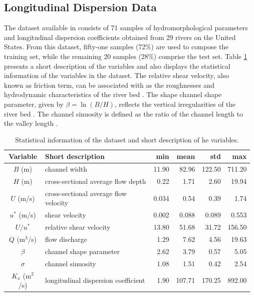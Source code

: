 \documentclass[a4paper,12pt, english]{article}
\begin{document}
\subsection{\label{sec:methods:dataset} Longitudinal Dispersion Data}
The dataset available in \cite{tayfur2005predicting} consists of 71 samples of hydromorphological parameters and longitudinal dispersion coefficients obtained from 29 rivers on the United States.  
From this dataset, fifty-one samples (72\%) are used to compose the training set, while the remaining 20 samples (28\%) comprise the test set. Table \ref{tab:input-output-var} presents a short description of the variables and also displays the statistical information of the variables in the dataset.
%
The relative shear velocity, also known as friction term,
 can be associated with as the
roughnesses and hydrodynamic characteristics of the river bed \cite{etemad2012predicting}.
The shape channel shape parameter, given by  $\beta=\ln{(B/H)}$,  reflects  the vertical
 irregularities of the river bed \cite{deng2001longitudinal}.
The channel sinuosity is defined as the ratio of the channel length to the valley length \cite{sahay:2013}. 
% 
\begin{table}[!htb]
\centering
\caption{ \label{tab:input-output-var} Statistical information  of the dataset and short description of he variables. }
\begin{center}
\begin{tabular}{clrrrr}
 \hline
Variable           &     Short description                     &   min&   mean &    std &     max \\ \hline
$ B     $ (m)      &     channel width                         & 11.90&  82.96 & 122.50 & 711.20  \\
$ H     $ (m)      &     cross-sectional average flow depth    &  0.22&   1.71 &   2.60 &  19.94  \\
$ U     $ (m/s)    &     cross-sectional average flow velocity & 0.034&   0.54 &   0.39 &   1.74  \\
$ u^*   $ (m/s)    &     shear velocity                        & 0.002&  0.088 &  0.089 &  0.553  \\
$ U/u^* $          &     relative shear velocity               & 13.80&  51.68 &  31.72 & 156.50  \\
$ Q     $ (m$^3$/s)&     flow discharge                        &  1.29&   7.62 &   4.56 &  19.63  \\
$ \beta $          &     channel shape parameter               &  2.62&   3.79 &   0.57 &   5.05  \\
$ \sigma$          &     channel sinuosity                     &  1.08&   1.51 &   0.42 &   2.54  \\\hline
$ K_x   $ (m$^2$/s)&     longitudinal dispersion coefficient   &  1.90& 107.71 & 170.25 & 892.00  \\ \hline
\end{tabular}
\end{center}
\end{table}
\end{document}

